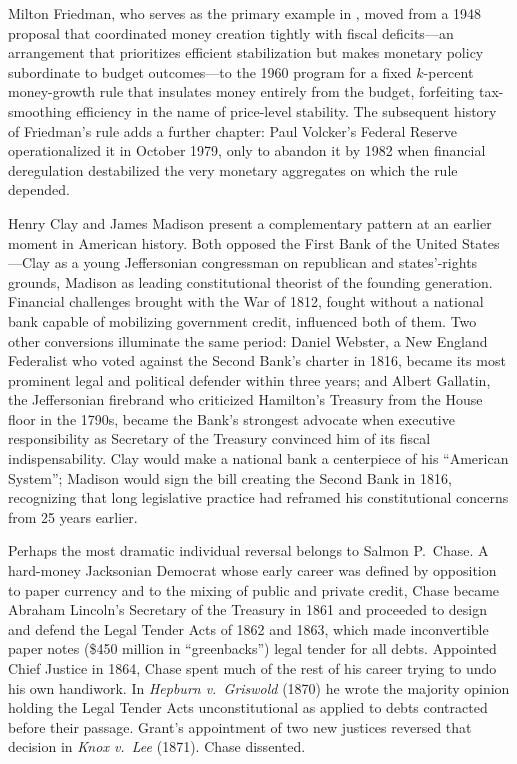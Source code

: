 \documentclass[12pt]{article}
\begin{document}
Milton Friedman, who serves as the primary example in \citet{Sargent2011},
moved from a 1948 proposal that coordinated money creation tightly with
fiscal deficits---an arrangement that prioritizes efficient stabilization
but makes monetary policy subordinate to budget outcomes---to the 1960
program for a fixed $k$-percent money-growth rule that insulates money
entirely from the budget, forfeiting tax-smoothing efficiency in the
name of price-level stability.  The subsequent history of Friedman's
rule adds a further chapter: Paul Volcker's Federal Reserve
operationalized it in October 1979, only to abandon it by 1982 when
financial deregulation destabilized the very monetary aggregates on
which the rule depended.

Henry Clay and James Madison present a complementary pattern at an
earlier moment in American history.  Both opposed the First Bank of the
United States---Clay as a young Jeffersonian congressman on republican
and states'-rights grounds, Madison as leading constitutional
theorist of the founding generation.  Financial challenges brought with the
War of 1812, fought without a national bank capable of mobilizing
government credit, influenced both of them.  Two other  conversions
illuminate the same period: Daniel Webster, a New England Federalist who
voted against the Second Bank's charter in 1816, became its most
prominent legal and political defender within three years; and Albert
Gallatin, the Jeffersonian firebrand who criticized Hamilton's Treasury
from the House floor in the 1790s, became the Bank's strongest advocate
when executive responsibility as Secretary of the Treasury convinced him of  its
fiscal indispensability.  Clay would make a national bank
a centerpiece of his ``American System''; Madison would sign the bill
creating the Second Bank in 1816, recognizing 
that long legislative practice had reframed his constitutional
concerns from 25 years earlier.

Perhaps the  most dramatic individual reversal belongs to Salmon P.\ Chase.  A
hard-money Jacksonian Democrat whose early career was defined by
opposition to paper currency and to the mixing of public and private
credit, Chase became Abraham Lincoln's Secretary of the Treasury in 1861
and proceeded to design and defend the Legal Tender Acts of 1862 and
1863, which made inconvertible paper notes (\$450 million in
``greenbacks'') legal tender for all debts.  Appointed Chief Justice
in 1864, Chase spent much of the rest of his career trying to undo his own
handiwork.  In \textit{Hepburn v.\ Griswold} (1870) he wrote the
majority opinion holding the Legal Tender Acts unconstitutional as
applied to debts contracted before their passage.  Grant's appointment  of
two new justices reversed that decision in \textit{Knox v.\ Lee} (1871).
Chase dissented.
\end{document}
